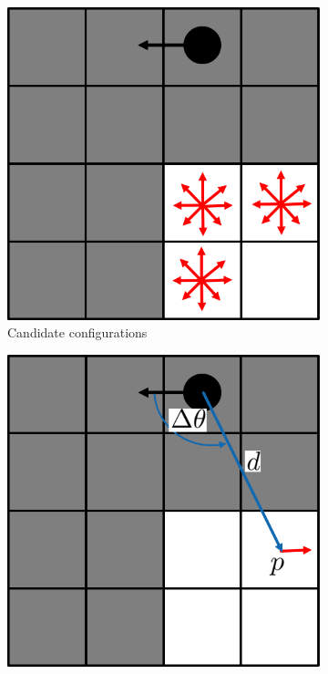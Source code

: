 \begin{figure}
    \centering
    \begin{subfigure}[b]{0.48\textwidth}
        \includegraphics[width=\textwidth]{Report/images/baselinea.png}
        \caption{Candidate configurations}
        \label{subfig:baseline_a}
    \end{subfigure}
    \begin{subfigure}[b]{0.48\textwidth}
        \includegraphics[width=\textwidth]{Report/images/baselineb.png}

\end{subfigure}
\end{figure}
